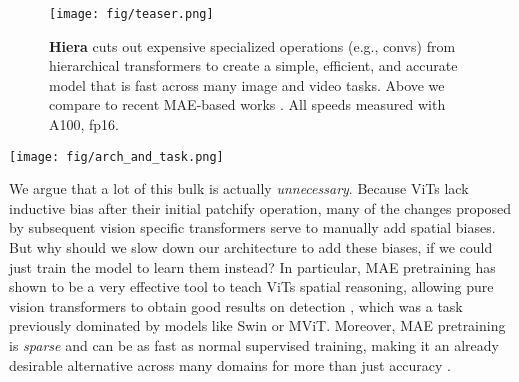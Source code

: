 \documentclass[nohyperref]{article}
\newcommand{\name}{{Hiera}}
\newcommand{\shortname}{{Hiera}}
\theoremstyle{plain}
\theoremstyle{definition}
\theoremstyle{remark}
\begin{document}
\begin{figure}[t!]
    \centering
    \texttt{[image: fig/teaser.png]}
    \vspace{-15pt}
    \caption{ \textbf{\name{}} cuts out expensive specialized operations (e.g., convs) from hierarchical transformers to create a simple, efficient, and accurate model that is fast across many image and video tasks. Above we compare to recent MAE-based works \cite{woo2023convnextv2,mae-st}. All speeds measured with A100, fp16. }
    \label{fig:concept}
    \vspace{-10pt}
\end{figure}
\begin{figure*}[th]
\centering
\texttt{[image: fig/arch\_and\_task.png]}
\vspace{-.1em}
\caption{\textbf{\shortname{} Setup.}
Modern hierarchical transformers like Swin \cite{swin} or MViT \cite{mvitv2} are more parameter efficient than vanilla ViTs \cite{vit}, but end up slower due to overhead from adding spatial bias through vision-specific modules like shifted windows or convs. In contrast, we design \shortname{} to be as simple as possible. To add spatial bias, we opt to \textit{teach} it to the model using a strong pretext task like MAE (pictured here) instead. \shortname{} consists entirely of standard ViT blocks. For efficiency, we use local attention within ``mask units'' (Fig.~\ref{fig:architecture_overlap},~\ref{fig:pool_vs_mu_attn}) for the first two stages and global attention for the rest.
At each stage transition,  and the skip connection have their features doubled by a linear layer and spatial dimension pooled by a  maxpool. \shortname{-B} is shown here (see Tab.~\ref{tab:hiera_configs} for other configs).
}
\label{fig:arch_and_task}\vspace{.5em}
\end{figure*}



We argue that a lot of this bulk is actually \textit{unnecessary}. 
Because ViTs lack inductive bias after their initial patchify operation, many of the changes proposed by subsequent vision specific transformers serve to manually add spatial biases. But why should we slow down our architecture to add these biases, if we could just train the model to learn them instead? In particular, MAE pretraining has shown to be a very effective tool to teach ViTs spatial reasoning, allowing pure vision transformers to obtain good results on detection \cite{vitdet}, which was a task previously dominated by models like Swin or MViT. Moreover, MAE pretraining is \textit{sparse} and can be  as fast as normal supervised training, making it an already desirable alternative across many domains for more than just accuracy \cite{mae,mae-st,mae-audio}.
\end{document}
